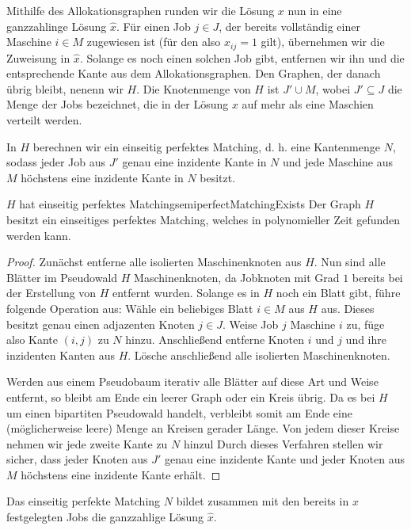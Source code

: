 \documentclass[language=ngerman,algolist]{TemplateLecture}
\begin{document}
Mithilfe des Allokationsgraphen runden wir die Lösung $x$ nun in eine ganzzahlinge Lösung $\hat{x}$. Für einen Job $j \in J$, der bereits vollständig einer Maschine $i \in M$ zugewiesen ist (für den also $x_{ij} = 1$ gilt), übernehmen wir die Zuweisung in $\hat{x}$. Solange es noch einen solchen Job gibt, entfernen wir ihn und die entsprechende Kante aus dem Allokationsgraphen. Den Graphen, der danach übrig bleibt, nenenn wir $H$. Die Knotenmenge von $H$ ist $J' \cup M$, wobei $J' \subseteq J$ die Menge der Jobs bezeichnet, die in der Lösung $x$ auf mehr als eine Maschien verteilt werden.

In $H$ berechnen wir ein einseitig perfektes Matching, d. h. eine Kantenmenge $N$, sodass jeder Job aus $J'$ genau eine inzidente Kante in $N$ und jede Maschine aus $M$ höchstens eine inzidente Kante in $N$ besitzt.

\begin{lem}{$H$ hat einseitig perfektes Matching}{semiperfectMatchingExists}
    Der Graph $H$ besitzt ein einseitiges perfektes Matching, welches in polynomieller Zeit gefunden werden kann.
\end{lem}
\begin{proof}
    Zunächst entferne alle isolierten Maschinenknoten aus $H$. Nun sind alle Blätter im Pseudowald $H$ Maschinenknoten, da Jobknoten mit Grad $1$ bereits bei der Erstellung von $H$ entfernt wurden. Solange es in $H$ noch ein Blatt gibt, führe folgende Operation aus: Wähle ein beliebiges Blatt $i \in M$ aus $H$ aus. Dieses besitzt genau einen adjazenten Knoten $j \in J$. Weise Job $j$ Maschine $i$ zu, füge also Kante $(i,j)$ zu $N$ hinzu. Anschließend entferne Knoten $i$ und $j$ und ihre inzidenten Kanten aus $H$. Lösche anschließend alle isolierten Maschinenknoten.

    Werden aus einem Pseudobaum iterativ alle Blätter auf diese Art und Weise entfernt, so bleibt am Ende ein leerer Graph oder ein Kreis übrig. Da es bei $H$ um einen bipartiten Pseudowald handelt, verbleibt somit am Ende eine (möglicherweise leere) Menge an Kreisen gerader Länge. Von jedem dieser Kreise nehmen wir jede zweite Kante zu $N$ hinzul Durch dieses Verfahren stellen wir sicher, dass jeder Knoten aus $J'$ genau eine inzidente Kante und jeder Knoten aus $M$ höchstens eine inzidente Kante erhält.
\end{proof}

Das einseitig perfekte Matching $N$ bildet zusammen mit den bereits in $x$ festgelegten Jobs die ganzzahlige Lösung $\hat{x}$.
\end{document}
